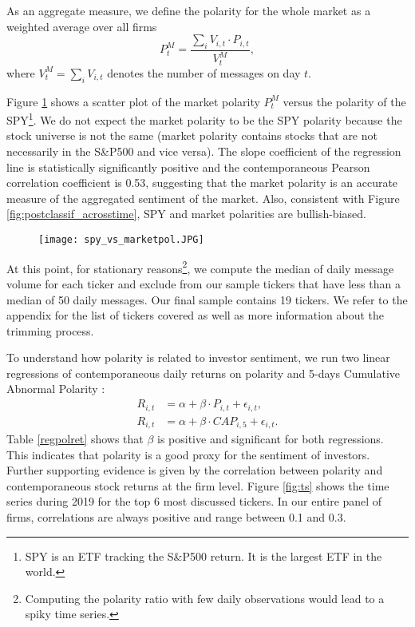 As an aggregate measure, we define the polarity for the whole market as a weighted average over all firms 
\begin{equation*}
\label{marketpoleq}
    P_t^M = \dfrac{\sum_{i} V_{i,t} \cdot P_{i,t}}{V^M_t} ,
\end{equation*}
where $V^M_t = \sum_{i} V_{i,t}$ denotes the number of messages on day $t$.

Figure \ref{fig:marketpolspy} shows a scatter plot of the market polarity $P_{t}^M$ versus the polarity of the SPY\footnote{SPY is an ETF tracking the S\&P500 return. It is the largest ETF in the world.}. We do not expect the market polarity to be the SPY polarity because the stock universe is not the same (market polarity contains stocks that are not necessarily in the S\&P500 and vice versa). The slope coefficient of the regression line is statistically significantly positive and the contemporaneous Pearson correlation coefficient is 0.53, suggesting that the market polarity is an accurate measure of the aggregated sentiment of the market. Also, consistent with Figure \ref{fig:postclassif_acrosstime}, SPY and market polarities are bullish-biased.

\begin{figure}[h]
    \centering
    \texttt{[image: spy\_vs\_marketpol.JPG]}
    \label{fig:marketpolspy}
\end{figure}

At this point, for stationary reasons\footnote{Computing the polarity ratio with few daily observations would lead to a spiky time series.}, we compute the median of daily message volume for each ticker and exclude from our sample tickers that have less than a median of 50 daily messages. Our final sample contains 19 tickers. We refer to the appendix for the list of tickers covered as well as more information about the trimming process. 

To understand how polarity is related to investor sentiment, we run two linear regressions of contemporaneous daily returns on polarity and 5-days Cumulative Abnormal Polarity :
\begin{align*}
    R_{i,t} &= \alpha + \beta \cdot P_{i,t} + \epsilon_{i,t}, \\
    R_{i,t} &= \alpha + \beta \cdot CAP_{i,5} + \epsilon_{i,t}. 
\end{align*}
Table \ref{regpolret} shows that $\beta$ is positive and significant for both regressions. This indicates that polarity is a good proxy for the sentiment of investors. Further supporting evidence is given by the correlation between polarity and contemporaneous stock returns at the firm level. Figure \ref{fig:ts} shows the time series during 2019 for the top 6 most discussed tickers. In our entire panel of firms, correlations are always positive and range between 0.1 and 0.3.

